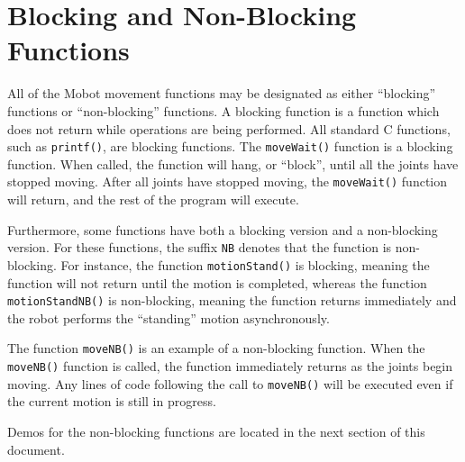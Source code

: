 \documentclass{article}
\begin{document}
\section{\label{sec:blocking}Blocking and Non-Blocking Functions}
All of the Mobot movement functions may be designated as either ``blocking'' 
functions or ``non-blocking'' functions. A blocking function is a function which
does not return while operations are being performed. All standard C functions,
such as \texttt{printf()}, are blocking functions. The
\texttt{moveWait()} function is a blocking function. When called, the function
will hang, or ``block'', until all the joints have stopped moving. After all
joints have stopped moving, the \texttt{moveWait()} function will return, and 
the rest of the program will execute.

Furthermore, some functions have both a blocking version and a non-blocking
version. For these functions, the suffix \texttt{NB} denotes that the function
is non-blocking. For instance, the function \texttt{motionStand()} is blocking,
meaning the function will not return until the motion is completed, whereas
the function \texttt{motionStandNB()} is non-blocking, meaning the function
returns immediately and the robot performs the ``standing'' motion
asynchronously.

The function \texttt{moveNB()} is an example of a non-blocking function. When
the \texttt{moveNB()} function is called, the function immediately returns 
as the joints begin moving. Any lines of code following the call to 
\texttt{moveNB()} will be executed even if the current motion is still in
progress. 

Demos for the non-blocking functions are located in the next section of
this document.
\end{document}
